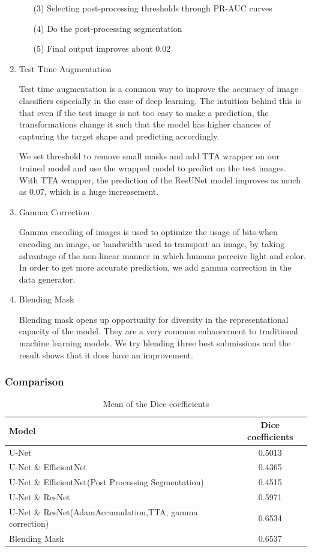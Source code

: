 \documentclass[UTF8]{article}
\begin{document}
\begin{enumerate}
\begin{enumerate}
			\item [(3)] Selecting post-processing thresholds through PR-AUC curves
			\item [(4)] Do the post-processing segmentation
			\item [(5)] Final output improves about 0.02
		\end{enumerate}
		\item Test Time Augmentation\par
		\noindent Test time augmentation is a common way to improve the accuracy of image classifiers especially in the case of deep learning. The intuition behind this is that even if the test image is not too easy to make a prediction, the transformations change it such that the model has higher chances of capturing the target shape and predicting accordingly.\par
		\noindent We set threshold to remove small masks and add TTA wrapper on our trained model and use the wrapped model to predict on the test images. With TTA wrapper, the prediction of the ResUNet model improves as much as 0.07, which is a huge increasement.
		\item Gamma Correction\par
		\noindent Gamma encoding of images is used to optimize the usage of bits when encoding an image, or bandwidth used to transport an image, by taking advantage of the non-linear manner in which humans perceive light and color. In order to get more accurate prediction, we add gamma correction in the data generator.
		\item Blending Mask\par
		\noindent Blending mask opens up opportunity for diversity in the representational capacity of the model. They are a very common enhancement to traditional machine learning models. We try blending three best submissions and the result shows that it does have an improvement.\par
	\end{enumerate}

	\subsubsection{Comparison}
		\begin{table}[h]
	\centering
	\setlength{\abovecaptionskip}{0pt}    
	\setlength{\belowcaptionskip}{10pt}
	\caption{Mean of the Dice coefficients}
	\begin{tabular}{lc}
	\toprule
	Model& Dice coefficients\\
	\midrule
	U-Net& 0.5013\\
	U-Net \& EfficientNet& 0.4365\\
	U-Net \& EfficientNet(Post Processing Segmentation) & 0.4515\\
	U-Net \& ResNet& 0.5971\\
	U-Net \& ResNet(AdamAccumulation,TTA, gamma correction) & 0.6534\\
	Blending Mask&  0.6537\\
	\bottomrule
	\end{tabular}
	\end{table}
\end{document}
